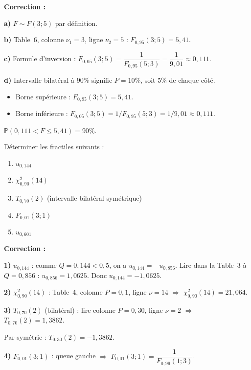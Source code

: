 \documentclass[11pt,a4paper]{article}
\newcommand{\Prob}{\mathbb{P}}
\renewcommand{\P}{\Prob}
\begin{document}
\textbf{Correction :}

\textbf{a)} $F \sim F(3;5)$ par d\'efinition.

\medskip
\textbf{b)} Table~6, colonne $\nu_1=3$, ligne $\nu_2=5$ : $F_{0{,}95}(3;5) = 5{,}41$.

\medskip
\textbf{c)} Formule d'inversion : $F_{0{,}05}(3;5) = \dfrac{1}{F_{0{,}95}(5;3)} = \dfrac{1}{9{,}01} \approx 0{,}111$.

\medskip
\textbf{d)} Intervalle bilat\'eral \`a $90\%$ signifie $P=10\%$, soit $5\%$ de chaque c\^ot\'e.
\begin{itemize}
\item Borne sup\'erieure : $F_{0{,}95}(3;5) = 5{,}41$.
\item Borne inf\'erieure : $F_{0{,}05}(3;5) = 1/F_{0{,}95}(5;3) = 1/9{,}01 \approx 0{,}111$.
\end{itemize}
$\P(0{,}111 < F \leq 5{,}41) = 90\%.$

\bigskip
\begin{thmbox}
D\'eterminer les fractiles suivants :
\begin{enumerate}
\item $u_{0{,}144}$
\item $\chi^2_{0{,}90}(14)$
\item $T_{0{,}70}(2)$ (intervalle bilat\'eral sym\'etrique)
\item $F_{0{,}01}(3;1)$
\item $u_{0{,}601}$
\end{enumerate}
\end{thmbox}

\textbf{Correction :}

\textbf{1)} $u_{0{,}144}$ : comme $Q = 0{,}144 < 0{,}5$, on a $u_{0{,}144} = -u_{0{,}856}$. Lire dans la Table~3 \`a $Q = 0{,}856$ : $u_{0{,}856} = 1{,}0625$. Donc $u_{0{,}144} = -1{,}0625$.

\medskip
\textbf{2)} $\chi^2_{0{,}90}(14)$ : Table~4, colonne $P=0{,}1$, ligne $\nu=14$ $\Rightarrow$ $\chi^2_{0{,}90}(14) = 21{,}064$.

\medskip
\textbf{3)} $T_{0{,}70}(2)$ (bilat\'eral) : lire colonne $P=0{,}30$, ligne $\nu=2$ $\Rightarrow$ $T_{0{,}70}(2) = 1{,}3862$.

Par sym\'etrie : $T_{0{,}30}(2) = -1{,}3862$.

\medskip
\textbf{4)} $F_{0{,}01}(3;1)$ : queue gauche $\Rightarrow$ $F_{0{,}01}(3;1) = \dfrac{1}{F_{0{,}99}(1;3)}$.
\end{document}
